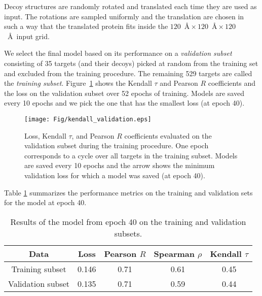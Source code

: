 Decoy structures are randomly rotated and translated each time they
are used as input. The rotations are sampled uniformly
\cite{shoemake1992uniform} and the translation are chosen in such a
way that the translated protein fits inside the $120$~\AA${}\times
120$~\AA${}\times 120$~\AA\ input grid.

We select the final model based on its performance on a
\emph{validation subset} consisting of 35 targets (and their decoys)
picked at random from the training set and excluded from the training
procedure. The remaining 529 targets are called the \emph{training
subset}.  Figure~\ref{Fig:TrainingLoss} shows the Kendall $\tau$ and
Pearson $R$ coefficients and the loss on the validation subset over 52
epochs of training.  Models are saved every 10 epochs and we pick the
one that has the smallest loss (at epoch 40).

\begin{figure}[H]
    \centering
    \texttt{[image: Fig/kendall\_validation.eps]}
%
    \caption{Loss, Kendall $\tau$, and Pearson $R$ coefficients
      evaluated on the validation subset during the training
      procedure.  One epoch corresponds to a cycle over all targets in
      the training subset. Models are saved every 10 epochs and the
      arrow shows the minimum validation loss for which a model was
      saved (at epoch 40).}
%
    \label{Fig:TrainingLoss}
\end{figure}

Table \ref{Tbl:TrainingResults} summarizes the performance metrics on
the training and validation sets for the model at epoch 40.

\begin{table}[H]
\begin{center}
\begin{tabular}{ c | c | c | c | c }
    Data & Loss & Pearson $R$ & Spearman $\rho$ & Kendall $\tau$ \\
    \hline
    Training subset     &0.146 &0.71 &0.61 &0.45 \\
    Validation subset   &0.135 &0.71 &0.59 &0.44 \\ \hline

\end{tabular}
  \caption {Results of the model from epoch 40 on the training and validation subsets.}
    \label{Tbl:TrainingResults}
\end{center}
\end{table}
